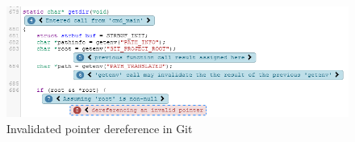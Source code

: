 \begin{figure}[H]
	\centering
	\includegraphics[width=\textwidth]{images/git_report.PNG}
	\caption{Invalidated pointer dereference in Git}
	\label{fig:git-rep}
\end{figure}

